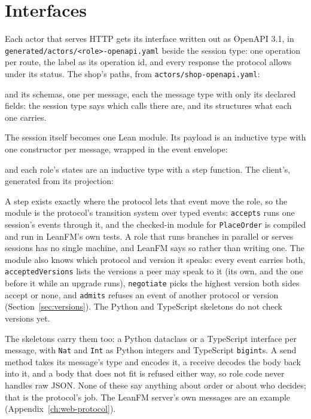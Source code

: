 \section{Interfaces}

Each actor that serves HTTP gets its interface written out as OpenAPI 3.1, in
\texttt{generated/actors/<role>-openapi.yaml} beside the session type: one
operation per route, the label as its operation id, and every response the
protocol allows under its status. The shop's paths, from
\texttt{actors/shop-openapi.yaml}:



and its schemas, one per message, each the message type with only its declared
fields: the session type says which calls there are, and its structures what each
one carries.



The session itself becomes one Lean module. Its payload is an inductive type with
one constructor per message, wrapped in the event envelope:



and each role's states are an inductive type with a step function. The client's,
generated from its projection:



A step exists exactly where the protocol lets that event move the role, so the
module is the protocol's transition system over typed events: \texttt{accepts}
runs one session's events through it, and the checked-in module for
\texttt{PlaceOrder} is compiled and run in LeanFM's own tests. A role that runs
branches in parallel or serves sessions has no single machine, and LeanFM says so
rather than writing one. The module also knows which protocol and version it
speaks: every event carries both, \texttt{acceptedVersions} lists the versions a
peer may speak to it (its own, and the one before it while an upgrade runs),
\texttt{negotiate} picks the highest version both sides accept or none, and
\texttt{admits} refuses an event of another protocol or version
(Section~\ref{sec:versions}). The Python and TypeScript skeletons do not check
versions yet.

The skeletons carry them too: a Python dataclass or a TypeScript interface per
message, with \texttt{Nat} and \texttt{Int} as Python integers and TypeScript
\texttt{bigint}s. A send method takes its message's type and encodes it, a
receive decodes the body back into it, and a body that does not fit is refused
either way, so role code never handles raw JSON. None of these say anything
about order or about who decides; that is the protocol's job. The LeanFM server's
own messages are an example (Appendix~\ref{ch:web-protocol}).

